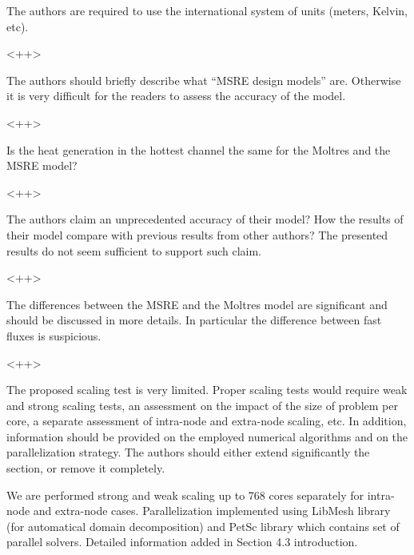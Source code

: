 \documentclass[answers,11pt]{exam}
\begin{document}
\begin{questions}
\question The authors are required to use the international system of units (meters, Kelvin, etc).
\begin{solution}
        <++>
\end{solution}

\question The authors should briefly describe what ``MSRE design models'' are. Otherwise it is very difficult for the readers to assess the accuracy of the model.
\begin{solution}
        <++>
\end{solution}

\question Is the heat generation in the hottest channel the same for the Moltres and the MSRE model?
\begin{solution}
        <++>
\end{solution}

\question The authors claim an unprecedented accuracy of their model? How the results of their model compare with previous results from other authors? The presented results do not seem sufficient to support such claim.
\begin{solution}
        <++>
\end{solution}

\question The differences between the MSRE and the Moltres model are significant and should be discussed in more details. In particular the difference between fast fluxes is suspicious.
\begin{solution}
        <++>
\end{solution}

\question The proposed scaling test is very limited. Proper scaling tests would require weak and strong scaling tests, an assessment on the impact of the size of problem per core, a separate assessment of intra-node and extra-node scaling, etc. In addition, information should be provided on the employed numerical algorithms and on the parallelization strategy. The authors should either extend significantly the section, or remove it completely.
\begin{solution}
        We are performed strong and weak scaling up to 768 cores separately for intra-node and extra-node cases. Parallelization implemented using LibMesh library (for automatical domain decomposition) and PetSc library which contains set of parallel solvers. Detailed information added in Section 4.3 introduction.
\end{solution}


\end{questions}


  
\end{document}
